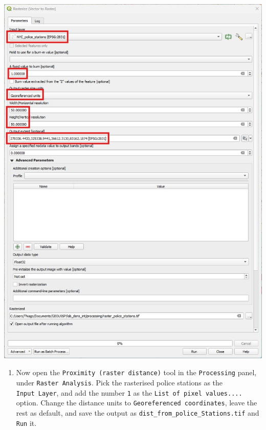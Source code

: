 \documentclass[
  letterpaper,
  DIV=11,
  numbers=noendperiod]{scrreprt}
\providecommand{\tightlist}{%
  \setlength{\itemsep}{0pt}\setlength{\parskip}{0pt}}\usepackage{longtable,booktabs,array}
\begin{document}
\includegraphics{images/lab_13/lab13_fig_rasterise.jpg}

\begin{enumerate}
\def\labelenumi{(\arabic{enumi})}
\setcounter{enumi}{349}
\tightlist
\item
  Now open the \texttt{Proximity\ (raster\ distance)} tool in the
  \texttt{Processing} panel, under \texttt{Raster\ Analysis}. Pick the
  rasterised police stations as the \texttt{Input\ Layer}, and add the
  number \texttt{1} as the \texttt{List\ of\ pixel\ values....} option.
  Change the distance units to \texttt{Georeferenced\ coordinates},
  leave the rest as default, and save the output as
  \texttt{dist\_from\_police\_Stations.tif} and \texttt{Run} it.
\end{enumerate}
\end{document}
